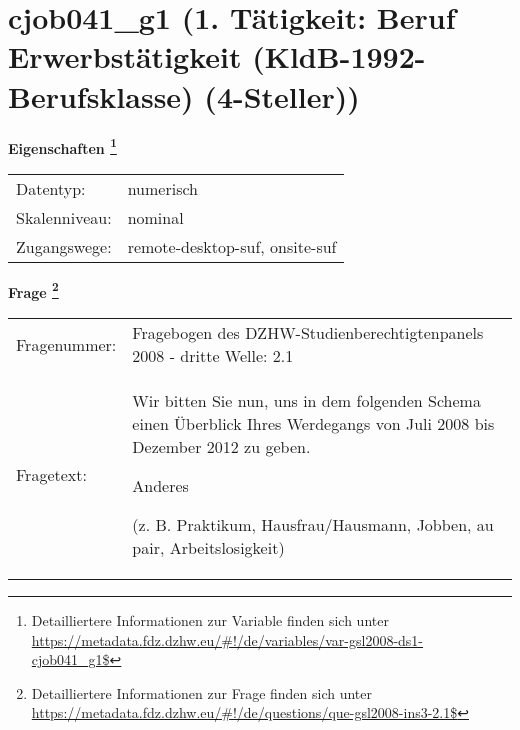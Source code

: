 
    \setcounter{footnote}{0}

    \vspace*{-1.8cm}
	\section{cjob041\_g1 (1. Tätigkeit: Beruf Erwerbstätigkeit (KldB-1992-Berufsklasse) (4-Steller))}
	\label{section:cjob041_g1}



    \vspace*{0.5cm}
    \noindent\textbf{Eigenschaften
	\footnote{Detailliertere Informationen zur Variable finden sich unter
		\url{https://metadata.fdz.dzhw.eu/\#!/de/variables/var-gsl2008-ds1-cjob041_g1$}}}\\
	\begin{tabularx}{\hsize}{@{}lX}
	Datentyp: & numerisch \\
	Skalenniveau: & nominal \\
	Zugangswege: &
	  remote-desktop-suf, 
	  onsite-suf
 \\
    \end{tabularx}



				\vspace*{0.5cm}
                \noindent\textbf{Frage
	                \footnote{Detailliertere Informationen zur Frage finden sich unter
		              \url{https://metadata.fdz.dzhw.eu/\#!/de/questions/que-gsl2008-ins3-2.1$}}}\\
				\begin{tabularx}{\hsize}{@{}lX}
					Fragenummer: &
					  Fragebogen des DZHW-Studienberechtigtenpanels 2008 - dritte Welle:
					  2.1
 \\
					Fragetext: & Wir bitten Sie nun, uns in dem folgenden Schema einen Überblick Ihres Werdegangs von Juli 2008 bis Dezember 2012 zu geben.\par  Anderes\par  (z. B. Praktikum, Hausfrau/Hausmann, Jobben, au pair, Arbeitslosigkeit) \\
				\end{tabularx}





